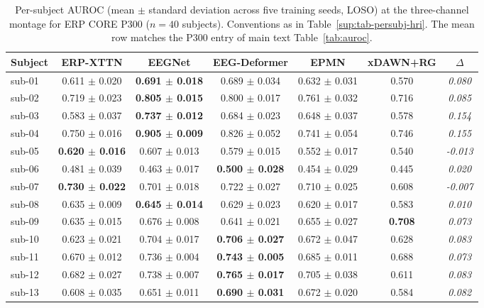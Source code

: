 \begin{table}[t]
\centering
\caption{%
Per-subject AUROC (mean $\pm$ standard deviation across five training seeds, LOSO) at the three-channel montage for ERP CORE P300 ($n = 40$ subjects). Conventions as in Table~\ref{sup:tab-persubj-hri}. The mean row matches the P300 entry of main text Table~\ref{tab:auroc}.%
}
\label{sup:tab-persubj-p300}
\begin{tabular}{lcccccc}
\toprule
Subject & ERP-XTTN & EEGNet & EEG-Deformer & EPMN & xDAWN+RG & $\Delta$ \\
\midrule
sub-01 & 0.611 $\pm$ 0.020 & \textbf{0.691 $\pm$ 0.018} & 0.689 $\pm$ 0.034 & 0.632 $\pm$ 0.031 & 0.570 & \textit{0.080} \\
sub-02 & 0.719 $\pm$ 0.023 & \textbf{0.805 $\pm$ 0.015} & 0.800 $\pm$ 0.017 & 0.761 $\pm$ 0.032 & 0.716 & \textit{0.085} \\
sub-03 & 0.583 $\pm$ 0.037 & \textbf{0.737 $\pm$ 0.012} & 0.684 $\pm$ 0.023 & 0.648 $\pm$ 0.037 & 0.578 & \textit{0.154} \\
sub-04 & 0.750 $\pm$ 0.016 & \textbf{0.905 $\pm$ 0.009} & 0.826 $\pm$ 0.052 & 0.741 $\pm$ 0.054 & 0.746 & \textit{0.155} \\
sub-05 & \textbf{0.620 $\pm$ 0.016} & 0.607 $\pm$ 0.013 & 0.579 $\pm$ 0.015 & 0.552 $\pm$ 0.017 & 0.540 & \textit{-0.013} \\
sub-06 & 0.481 $\pm$ 0.039 & 0.463 $\pm$ 0.017 & \textbf{0.500 $\pm$ 0.028} & 0.454 $\pm$ 0.029 & 0.445 & \textit{0.020} \\
sub-07 & \textbf{0.730 $\pm$ 0.022} & 0.701 $\pm$ 0.018 & 0.722 $\pm$ 0.027 & 0.710 $\pm$ 0.025 & 0.608 & \textit{-0.007} \\
sub-08 & 0.635 $\pm$ 0.009 & \textbf{0.645 $\pm$ 0.014} & 0.629 $\pm$ 0.023 & 0.620 $\pm$ 0.017 & 0.583 & \textit{0.010} \\
sub-09 & 0.635 $\pm$ 0.015 & 0.676 $\pm$ 0.008 & 0.641 $\pm$ 0.021 & 0.655 $\pm$ 0.027 & \textbf{0.708} & \textit{0.073} \\
sub-10 & 0.623 $\pm$ 0.021 & 0.704 $\pm$ 0.017 & \textbf{0.706 $\pm$ 0.027} & 0.672 $\pm$ 0.047 & 0.628 & \textit{0.083} \\
sub-11 & 0.670 $\pm$ 0.012 & 0.736 $\pm$ 0.004 & \textbf{0.743 $\pm$ 0.005} & 0.685 $\pm$ 0.011 & 0.688 & \textit{0.073} \\
sub-12 & 0.682 $\pm$ 0.027 & 0.738 $\pm$ 0.007 & \textbf{0.765 $\pm$ 0.017} & 0.705 $\pm$ 0.038 & 0.611 & \textit{0.083} \\
sub-13 & 0.608 $\pm$ 0.035 & 0.651 $\pm$ 0.011 & \textbf{0.690 $\pm$ 0.031} & 0.672 $\pm$ 0.020 & 0.584 & \textit{0.082} \\

\end{tabular}
\end{table}
